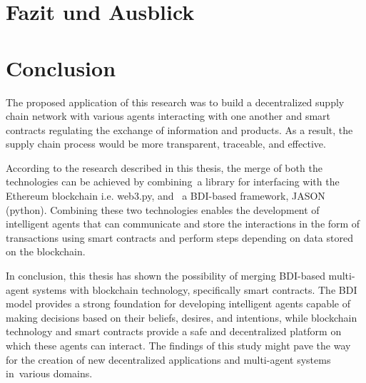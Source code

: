 {\chapter{Fazit und Ausblick}}
{\chapter{Conclusion}}

\label{sec:conclusion}

The proposed application of this research was to build a decentralized supply chain network with various agents interacting with one another and smart contracts regulating the exchange of information and products. As a result, the supply chain process would be more transparent, traceable, and effective. 

\vspace{.5cm}

According to the research described in this thesis, the merge of both the technologies can be achieved by combining a library for interfacing with the Ethereum blockchain i.e. web3.py, and  a \ac{BDI}-based framework, JASON (python). Combining these two technologies enables the development of intelligent agents that can communicate and store the interactions in the form of transactions using smart contracts and perform steps depending on data stored on the blockchain.

\vspace{.5cm}

In conclusion, this thesis has shown the possibility of merging \ac{BDI}-based multi-agent systems with blockchain technology, specifically smart contracts. The \ac{BDI} model provides a strong foundation for developing intelligent agents capable of making decisions based on their beliefs, desires, and intentions, while blockchain technology and smart contracts provide a safe and decentralized platform on which these agents can interact. The findings of this study might pave the way for the creation of new decentralized applications and multi-agent systems in various domains.


